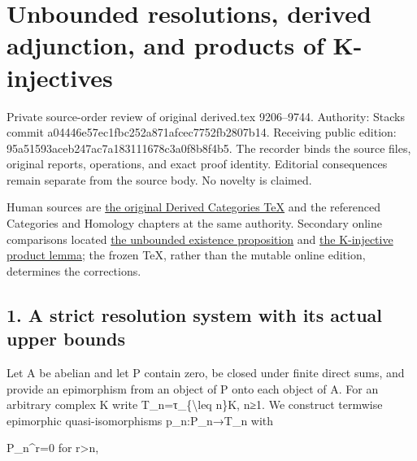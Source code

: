 \section{\texorpdfstring{Unbounded resolutions,\allowbreak{} derived adjunction,\allowbreak{} and products of K-injectives}{Unbounded  derived  and products of K-injectives}}\label{proofs-9206-9744-unbounded-resolutions-derived-adjunction-and-products-of-k-injectives}

Private source-order review of original derived.tex 9206–\allowbreak{}9744. Authority:\allowbreak{} Stacks commit a04446e5\allowbreak{}7ec1fbc2\allowbreak{}52a871af\allowbreak{}cec7752f\allowbreak{}b2807b14. Receiving public edition:\allowbreak{} 95a51593\allowbreak{}aceb247a\allowbreak{}c7a18311\allowbreak{}1678c3a0\allowbreak{}f8b8f4b5. The recorder binds the source files,\allowbreak{} original reports,\allowbreak{} operations,\allowbreak{} and exact proof identity. Editorial consequences remain separate from the source body. No novelty is claimed.

Human sources are \href{https://github.com/stacks/stacks-project/blob/a04446e57ec1fbc252a871afcec7752fb2807b14/derived.tex\#L9206}{the original Derived Categories TeX} and the referenced Categories and Homology chapters at the same authority. Secondary online comparisons located \href{https://stacks.math.columbia.edu/tag/0794}{the unbounded existence proposition} and \href{https://stacks.math.columbia.edu/tag/0BK6}{the K-injective product lemma}; the frozen TeX,\allowbreak{} rather than the mutable online edition,\allowbreak{} determines the corrections.

\subsection{1. A strict resolution system with its actual upper bounds}\label{proofs-9206-9744-a-strict-resolution-system-with-its-actual-upper-bounds}

Let A be abelian and let P contain zero,\allowbreak{} be closed under finite direct sums,\allowbreak{} and provide an epimorphism from an object of P onto each object of A. For an arbitrary complex K write T\_\allowbreak{}n\allowbreak{}=τ\_\allowbreak{}\{\textbackslash{}leq n\}K,\allowbreak{} n≥1. We construct termwise epimorphic quasi-isomorphisms p\_\allowbreak{}n:\allowbreak{}P\_\allowbreak{}n\allowbreak{}→T\_\allowbreak{}n with

P\_\allowbreak{}n\textasciicircum{}r\allowbreak{}=0 for r>n,\allowbreak{}

